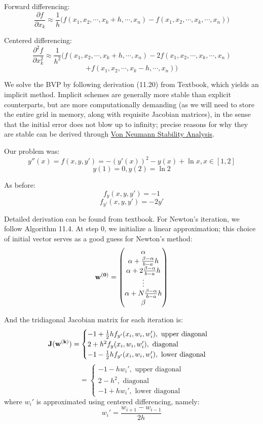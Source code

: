 \documentclass[12pt]{article} %
\newcommand{\1}[1]{\mathds{1}\left[#1\right]}
\begin{document}
Forward differencing:
$$
	\frac{\partial f}{\partial x_k} \approx \frac1h\bigg(
	f(x_1, x_2,\cdots, x_k+h, \cdots, x_n) - f(x_1, x_2,\cdots, x_k, \cdots, x_n)
	\bigg)
$$

Centered differencing:
$$
	\frac{\partial^2f}{\partial x_k^2} \approx \frac{1}{h^2}\bigg(
	f(x_1, x_2,\cdots, x_k+h, \cdots, x_n) - 2f(x_1, x_2,\cdots, x_k, \cdots, x_n) 
	$$
	$$+ f(x_1, x_2,\cdots, x_k-h, \cdots, x_n)
	\bigg)
$$

We solve the BVP by following derivation (11.20) from Textbook, which yields an implicit method. Implicit schemes are generally more stable than explicit counterparts, but are more computationally demanding (as we will need to store the entire grid in memory, along with requisite Jacobian matrices), in the sense that the initial error does not blow up to infinity; precise reasons for why they are stable can be derived through \href{https://en.wikipedia.org/wiki/Von_Neumann_stability_analysis}{\color{blue}Von Neumann Stability Analysis}.

Our problem was:
$$
	y''(x) = f(x, y, y') =  -(y'(x))^2 - y(x) + \ln x, x\in [1,2]
$$
$$
	y(1) = 0, y(2) = \ln 2
$$

As before:
$$
	f_{y}(x,y,y') = -1
$$
$$
	f_{y'}(x,y,y') = -2y'
$$

Detailed derivation can be found from textbook. For Newton's iteration, we follow Algorithm 11.4. At step 0, we initialize a linear approximation; this choice of initial vector serves as a good guess for Newton's method:
$$
	\bf{w}^{(0)} = 
	\begin{pmatrix}
	\alpha\\
	\alpha + \frac{\beta-\alpha}{b-a}h\\
	\alpha + 2\frac{\beta-\alpha}{b-a}h\\
	\vdots\\
	\alpha + N\frac{\beta-\alpha}{b-a}h\\
	\beta
	\end{pmatrix}
$$

And the tridiagonal Jacobian matrix for each iteration is:
$$
	\bf{J}(\bf{w^{(k)}}) = 
	\begin{cases}
		-1 + \frac12hf_{y'}(x_i, w_i, w_i'), \text{ upper diagonal}\\
		2 + h^2f_y(x_i, w_i, w_i'), \text{ diagonal}\\
		-1 - \frac12hf_{y'}(x_i, w_i, w_i'), \text{ lower diagonal}
	\end{cases}
	$$
	$$ = 
	\begin{cases}
		-1 - hw_i', \text{ upper diagonal}\\
		2 - h^2, \text{ diagonal}\\
		-1 + hw_i', \text{ lower diagonal}
	\end{cases}
$$ where $w_i'$ is approximated using centered differencing, namely:
$$
	w_{i}' = \frac{w_{i+1} - w_{i-1}}{2h}
$$
\end{document}
